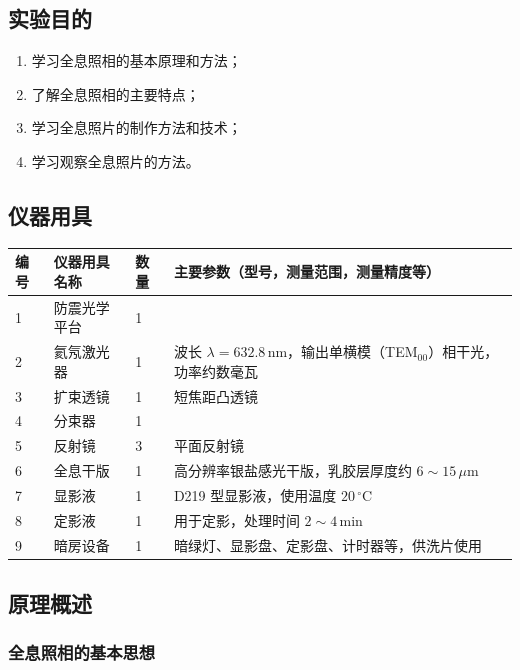 \documentclass[dvipsnames, svgnames,a4paper,11pt]{article}
\begin{document}
\clearpage


\setcounter{section}{0}

\subsection{实验目的}
\begin{enumerate}
	\item 学习全息照相的基本原理和方法；
	\item 了解全息照相的主要特点；
	\item 学习全息照片的制作方法和技术；
	\item 学习观察全息照片的方法。
\end{enumerate}

\subsection{仪器用具}
\begin{table}[htbp]
	\centering
	\renewcommand\arraystretch{1.6}
	\begin{tabular}{p{}|p{}|p{}|p{}}
	\hline
	编号 & 仪器用具名称 & 数量 & 主要参数（型号，测量范围，测量精度等） \\
	\hline
	1 & 防震光学平台 & 1 &  \\
	2 & 氦氖激光器 & 1 & 波长 $\lambda = 632.8\,\text{nm}$，输出单横模（TEM$_{00}$）相干光，功率约数毫瓦 \\
	3 & 扩束透镜 & 1 & 短焦距凸透镜 \\
	4 & 分束器 & 1 &  \\
	5 & 反射镜 & 3 & 平面反射镜\\
	6 & 全息干版 & 1 & 高分辨率银盐感光干版，乳胶层厚度约 $6\sim15\,\mu\text{m}$ \\
	7 & 显影液 & 1 & D219 型显影液，使用温度 $20\,^\circ\text{C}$\\
	8 & 定影液 & 1 & 用于定影，处理时间 $2\sim4\,\text{min}$ \\
	9 & 暗房设备 & 1 & 暗绿灯、显影盘、定影盘、计时器等，供洗片使用 \\
	\hline
\end{tabular}
\end{table}

\subsection{原理概述}

\subsubsection{全息照相的基本思想}
\end{document}
